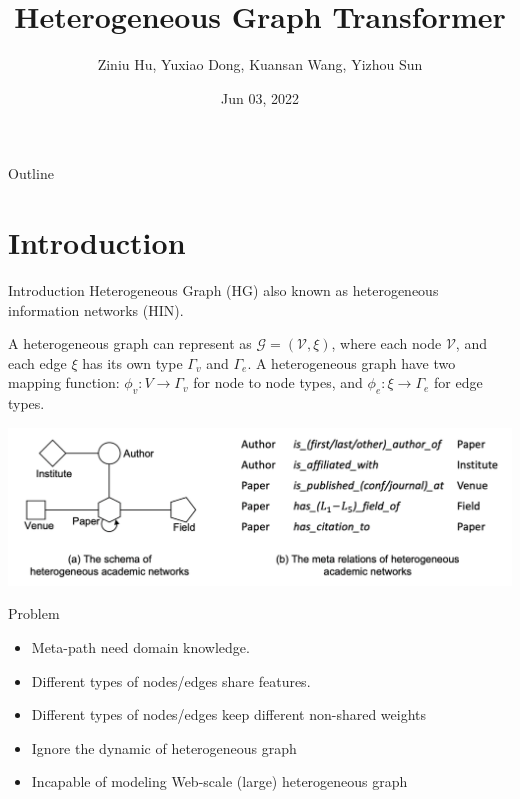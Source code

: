 \documentclass[aspectratio=1610,hyperref={colorlinks,unicode,linkcolor=blue,anchorcolor=blue,citecolor=blue,filecolor=black,urlcolor=blue}]{beamer}
\author{Ziniu Hu, Yuxiao Dong, Kuansan Wang, Yizhou Sun}
\date{Jun 03, 2022}
\title{Heterogeneous Graph Transformer}
\begin{document}
\maketitle
\begin{frame}{Outline}
\tableofcontents
\end{frame}


\section{Introduction}
\label{sec:orgef30a18}

\begin{frame}[label={sec:org61f9e7d}]{Introduction}
Heterogeneous Graph (HG) also known as heterogeneous information
networks (HIN).

A heterogeneous graph can represent as \(\mathcal{G} = (\mathcal{V},
\xi)\), where each node \(\mathcal{V}\), and each edge \(\xi\) has its own
type \(\Gamma_{v}\) and \(\Gamma_{e}\).  A heterogeneous graph have two
mapping function: \(\phi_{v}:V\rightarrow\Gamma_{v}\) for node to node
types, and \(\phi_{e}:\xi\rightarrow\Gamma_{e}\) for edge types.

\begin{center}
\includegraphics[width=.9\linewidth]{./p1.png}
\end{center}
\end{frame}

\begin{frame}[label={sec:orge14bd28}]{Problem}
\begin{itemize}
\item Meta-path need domain knowledge.
\item Different types of nodes/edges share features.
\item Different types of nodes/edges keep different non-shared weights
\item Ignore the dynamic of heterogeneous graph
\item Incapable of modeling Web-scale (large) heterogeneous graph
\end{itemize}
\end{frame}
\end{document}
